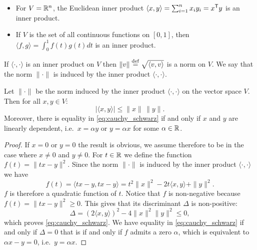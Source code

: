 \documentclass[11pt,nocut]{article}
\begin{document}
\begin{example}
	\leavevmode
	\begin{itemize}
		\item For $V = \mathbb{R}^n$, the Euclidean inner product $\langle x,y\rangle = \sum_{i=1}^n x_i y_i = x^{{\sf T}} y$ is an inner product.
		\item If $V$ is the set of all continuous functions on $[0,1]$, then $\langle f,g\rangle = \int_0^1 f(t) g(t) dt$ is an inner product.
	\end{itemize}
\end{example}

\begin{proposition}
	If $\langle \cdot, \cdot \rangle$ is an inner product on $V$ then $\| v \| \overset{\rm def}{=} \sqrt{\langle v, v \rangle}$ is a norm on $V$. We say  that the norm $\| \cdot \|$ is induced by the inner product $\langle \cdot, \cdot \rangle$.
\end{proposition}

\begin{theorem}
	Let $\| \cdot \|$ be the norm induced by the inner product $\langle \cdot , \cdot \rangle$ on the vector space $V$. Then for all $x,y \in V$:
	\begin{equation}\label{eq:cauchy_schwarz}
	| \langle x,y \rangle | \leq \|x\| \, \|y\|.
	\end{equation}
	Moreover, there is equality in \eqref{eq:cauchy_schwarz} if and only if $x$ and $y$ are linearly dependent, i.e.\ $x = \alpha y$ or $y = \alpha x$ for some $\alpha \in \mathbb{R}$.
\end{theorem}
\begin{proof}
	If $x = 0$ or $y = 0$ the result is obvious, we assume therefore to be in the case where $x \neq 0$ and $y \neq 0$.
	For $t \in \mathbb{R}$ we define the function $f(t) = \|t x - y \|^2$. Since the norm $\| \cdot \|$ is induced by the inner product $\langle \cdot, \cdot \rangle$ we have
	$$
	f(t) = \langle t x - y , t x - y \rangle = t^2 \|x\|^2 - 2t \langle x,y\rangle + \|y\|^2.
	$$
	$f$ is therefore a quadratic function of $t$. Notice that $f$ is non-negative because $f(t)= \|t x - y \|^2 \geq 0$. This gives that its discriminant $\Delta$ is non-positive:
	$$
	\Delta =  (2 \langle x,y \rangle)^2 - 4 \|x\|^2 \|y\|^2 \leq 0,
	$$
	which proves \eqref{eq:cauchy_schwarz}. We have equality in \eqref{eq:cauchy_schwarz} if and only if $\Delta = 0$ that is if and only if $f$ admits a zero $\alpha$, which is equivalent to $\alpha x - y = 0$, i.e.\ $y = \alpha x$.
\end{proof}
\end{document}
